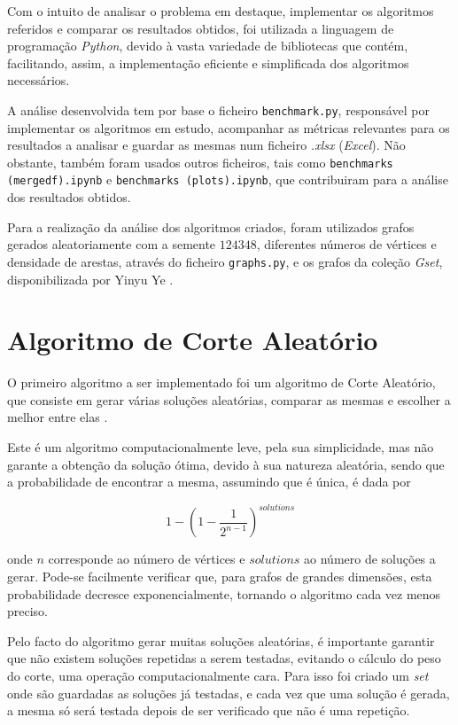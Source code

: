 \documentclass[mirror, portugues]{revdetua}
\begin{document}
Com o intuito de analisar o problema em destaque, implementar os algoritmos referidos e comparar os resultados obtidos, foi utilizada a linguagem de programação \textit{Python}, devido à vasta variedade de bibliotecas que contém, facilitando, assim, a implementação eficiente e simplificada dos algoritmos necessários.

A análise desenvolvida tem por base o ficheiro \texttt{benchmark.py}, responsável por implementar os algoritmos em estudo, acompanhar as métricas relevantes para os resultados a analisar e guardar as mesmas num ficheiro \textit{.xlsx} (\textit{Excel}). Não obstante, também foram usados outros ficheiros, tais como \texttt{benchmarks (mergedf).ipynb} e \texttt{benchmarks (plots).ipynb}, que contribuiram para a análise dos resultados obtidos.

Para a realização da análise dos algoritmos criados, foram utilizados grafos gerados aleatoriamente com a semente $124348$, diferentes números de vértices e densidade de arestas, através do ficheiro \texttt{graphs.py}, e os grafos da coleção \textit{Gset}, disponibilizada por Yinyu Ye \cite{GS24}.

\section{Algoritmo de Corte Aleatório}

O primeiro algoritmo a ser implementado foi um algoritmo de Corte Aleatório, que consiste em gerar várias soluções aleatórias, comparar as mesmas e escolher a melhor entre elas \cite{AG14}.

Este é um algoritmo computacionalmente leve, pela sua simplicidade, mas não garante a obtenção da solução ótima, devido à sua natureza aleatória, sendo que a probabilidade de encontrar a mesma, assumindo que é única, é dada por

$$1 - \left( 1 - \frac{1}{2^{n-1}} \right)^{solutions}$$

\noindent onde $n$ corresponde ao número de vértices e $solutions$ ao número de soluções a gerar. Pode-se facilmente verificar que, para grafos de grandes dimensões, esta probabilidade decresce exponencialmente, tornando o algoritmo cada vez menos preciso.

Pelo facto do algoritmo gerar muitas soluções aleatórias, é importante garantir que não existem soluções repetidas a serem testadas, evitando o cálculo do peso do corte, uma operação computacionalmente cara. Para isso foi criado um \textit{set} onde são guardadas as soluções já testadas, e cada vez que uma solução é gerada, a mesma só será testada depois de ser verificado que não é uma repetição.
\end{document}
